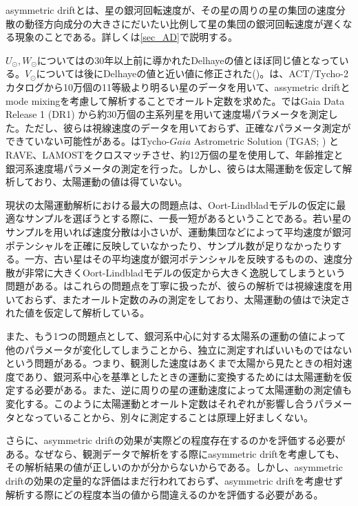 asymmetric driftとは、星の銀河回転速度が、その星の周りの星の集団の速度分散の動径方向成分の大きさにだいたい比例して星の集団の銀河回転速度が遅くなる現象のことである。詳しくは\ref{sec_AD}で説明する。

$U_{\odot}, W_{\odot}$については\cite{DB1998}の30年以上前に導かれたDelhayeの値とほぼ同じ値となっている。$V_{\odot}$については後にDelhayeの値と近い値に修正された(\cite{Schonrich2010})。\cite{OD03}は、ACT/Tycho-2カタログから10万個の11等級より明るい星のデータを用いて、assymetric driftとmode mixingを考慮して解析することでオールト定数を求めた。\cite{Bovy17}ではGaia Data Release 1 (DR1) から約30万個の主系列星を用いて速度場パラメータを測定した。ただし、彼らは視線速度のデータを用いておらず、正確なパラメータ測定ができていない可能性がある。\cite{VS18}はTycho-$Gaia$ Astrometric Solution (TGAS; \cite{Gaia2016}) とRAVE、LAMOSTをクロスマッチさせ、約12万個の星を使用して、年齢推定と銀河系速度場パラメータの測定を行った。しかし、彼らは太陽運動を仮定して解析しており、太陽運動の値は得ていない。

現状の太陽運動解析における最大の問題点は、Oort-Lindbladモデルの仮定に最適なサンプルを選ぼうとする際に、一長一短があるということである。若い星のサンプルを用いれば速度分散は小さいが、運動集団などによって平均速度が銀河ポテンシャルを正確に反映していなかったり、サンプル数が足りなかったりする。一方、古い星はその平均速度が銀河ポテンシャルを反映するものの、速度分散が非常に大きくOort-Lindbladモデルの仮定から大きく逸脱してしまうという問題がある。\cite{OD03}はこれらの問題点を丁寧に扱ったが、彼らの解析では視線速度を用いておらず、またオールト定数のみの測定をしており、太陽運動の値は\cite{OD03}で決定された値を仮定して解析している。

また、もう1つの問題点として、銀河系中心に対する太陽系の運動の値によって他のパラメータが変化してしまうことから、独立に測定すればいいものではないという問題がある。つまり、観測した速度はあくまで太陽から見たときの相対速度であり、銀河系中心を基準としたときの運動に変換するためには太陽運動を仮定する必要がある。また、逆に周りの星の運動速度によって太陽運動の測定値も変化する。このように太陽運動とオールト定数はそれぞれが影響し合うパラメータとなっていることから、別々に測定することは原理上好ましくない。

さらに、asymmetric driftの効果が実際どの程度存在するのかを評価する必要がある。なぜなら、観測データで解析をする際にasymmetric driftを考慮しても、その解析結果の値が正しいのかが分からないからである。しかし、asymmetric driftの効果の定量的な評価はまだ行われておらず、asymmetric driftを考慮せず解析する際にどの程度本当の値から間違えるのかを評価する必要がある。

